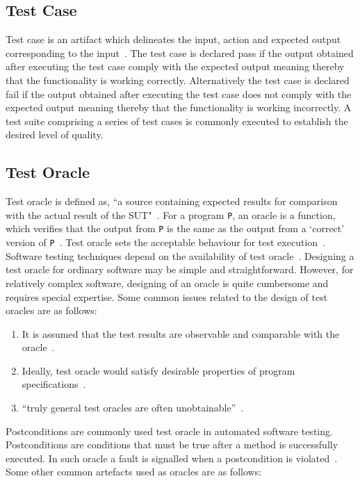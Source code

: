 \subsection{Test Case}
Test case is an artifact which delineates the input, action and expected output corresponding to the input~\cite{ahmed2010software}. The test case is declared pass if the output obtained after executing the test case comply with the expected output meaning thereby that the functionality is working correctly. Alternatively the test case is declared fail if the output obtained after executing the test case does not comply with the expected output meaning thereby that the functionality is working incorrectly. %
A test suite comprising a series of test cases is commonly executed to establish the desired level of quality.


\subsection{Test Oracle}
Test oracle is defined as, ``a source containing expected results for comparison with the actual result of the SUT"~\cite{ahmed2010software}. For a program \verb+P+, an oracle is a function, which verifies that the output from \verb+P+ is the same as the output from a ‘correct’ version of \verb+P+~\cite{howden1986functional}. Test oracle sets the acceptable behaviour for test execution~\cite{baresi2001test}. Software testing techniques depend on the availability of test oracle~\cite{gaudel2010software}. Designing a test oracle for ordinary software may be simple and straightforward. However, for relatively complex software, designing of an oracle is quite cumbersome and requires special expertise. 
Some common issues related to the design of test oracles are as follows:

\begin{enumerate}
\item It is assumed that the test results are observable and comparable with the oracle~\cite{weyuker1982testing}.
\item Ideally, test oracle would satisfy desirable properties of program specifications~\cite{baresi2001test}.
\item ``truly general test oracles are often unobtainable''~\cite{weyuker1982testing}. 
\end{enumerate}
\bigskip
Postconditions are commonly used test oracle in automated software testing. Postconditions are conditions that must be true after a method is successfully executed. In such oracle a fault is signalled when a postcondition is violated~\cite{meyer2009programs}. Some other common artefacts used as oracles are as follows:

